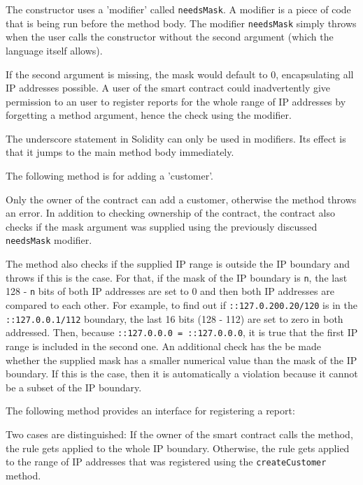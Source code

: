 The constructor uses a 'modifier' called \texttt{needsMask}. A modifier is a piece of code that is being run before the method body. The modifier \texttt{needsMask} simply throws when the user calls the constructor without the second argument (which the language itself allows).

If the second argument is missing, the mask would default to 0, encapsulating all IP addresses possible. A user of the smart contract could inadvertently give permission to an user to register reports for the whole range of IP addresses by forgetting a method argument, hence the check using the modifier.

The underscore statement in Solidity can only be used in modifiers. Its effect is that it jumps to the main method body immediately.

The following method is for adding a 'customer'.



Only the owner of the contract can add a customer, otherwise the method throws an error. In addition to checking ownership of the contract, the contract also checks if the mask argument was supplied using the previously discussed \texttt{needsMask} modifier.

The method also checks if the supplied IP range is outside the IP boundary and throws if this is the case. For that, if the mask of the IP boundary is \texttt{n}, the last 128 - \texttt{n} bits of both IP addresses are set to 0 and then both IP addresses are compared to each other. For example, to find out if \texttt{::127.0.200.20/120} is in the \texttt{::127.0.0.1/112} boundary, the last 16 bits (128 - 112) are set to zero in both addressed. Then, because \texttt{::127.0.0.0 = ::127.0.0.0}, it is true that the first IP range is included in the second one. An additional check has the be made whether the supplied mask has a smaller numerical value than the mask of the IP boundary. If this is the case, then it is automatically a violation because it cannot be a subset of the IP boundary.

The following method provides an interface for registering a report:



Two cases are distinguished: If the owner of the smart contract calls the method, the rule gets applied to the whole IP boundary. Otherwise, the rule gets applied to the range of IP addresses that was registered using the \texttt{createCustomer} method.

